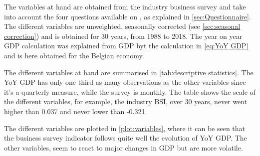 \documentclass[12pt,a4paper,oneside]{book}
\begin{document}
The variables at hand are obtained from the industry business survey and take into account the four questions available on , as explained in \autoref{sec:Questionnaire}.
The different variables are unweighted, seasonally corrected (see \autoref{sec:seasonal correction}) and is obtained for 30 years, from 1988 to 2018.
The year on year GDP calculation was explained from GDP byt the calculation in \autoref{eq:YoY GDP} and is here obtained for the Belgian economy.

The different variables at hand are summarised in \autoref{tab:descriptive statistics}. The YoY GDP has only one third as many observations as the other variables since it's a quarterly measure, while the survey is monthly. 
The table shows the scale of the different variables, for example, the industry BSI, over 30 years, never went higher than 0.037 and never lower than -0.321.

The different variables are plotted in \autoref{plot:variables}, where it can be seen that the business survey indicator follows quite well the evolution of YoY GDP. 
The other variables, seem to react to major changes in GDP but are more volatile.
\end{document}
